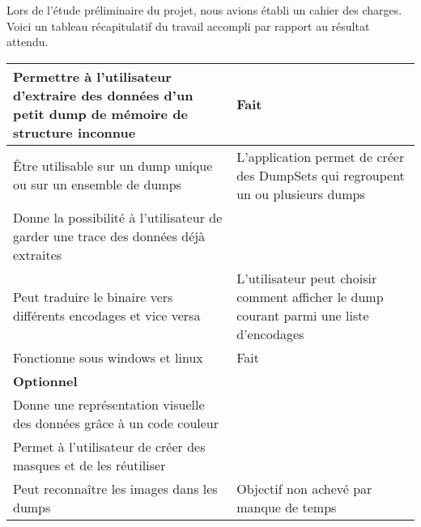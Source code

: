 Lors de l’étude préliminaire du projet, nous avions établi un cahier des charges. Voici un tableau récapitulatif du travail accompli par rapport au résultat attendu.


\begin{tabular}{|p{6cm}|p{6cm}|}
  \hline
  Permettre à l’utilisateur d’extraire des données d’un petit dump de mémoire de structure inconnue &
  Fait
  \\ \hline
  Être utilisable sur un dump unique ou sur un ensemble de dumps &
  L'application permet de créer des DumpSets qui regroupent un ou plusieurs dumps
  \\ \hline
  Donne la possibilité à l’utilisateur de garder une trace des données déjà extraites &
  
  \\ \hline
  Peut traduire le binaire vers différents encodages et vice versa &
  L'utilisateur peut choisir comment afficher le dump courant parmi une liste d'encodages
  \\ \hline
  Fonctionne sous windows et linux &
  Fait
  \\ \hline \hline
  \textbf{Optionnel} &
  \\ \hline
  Donne une représentation visuelle des données grâce à un code couleur &
  
  \\ \hline
  Permet à l’utilisateur de créer des masques et de les réutiliser &
  
  \\ \hline
  Peut reconnaître les images dans les dumps &
  Objectif non achevé par manque de temps
  \\ \hline
\end{tabular}
